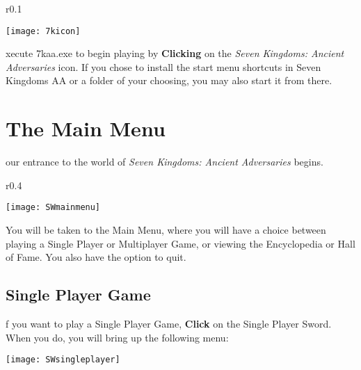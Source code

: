 \begin{wrapfigure}{r}{0.1\textwidth}
	\vspace{-20pt}
	\begin{center}
		\texttt{[image: 7kicon]}
	\end{center}
	\vspace{-20pt}
\end{wrapfigure}

xecute 7kaa.exe to begin playing by \textbf{Clicking} on the \textit{Seven Kingdoms: Ancient Adversaries} icon. If you chose to install the start menu shortcuts in Seven Kingdoms AA or a folder of your choosing, you may also start it from there.

\section{The Main Menu}


our entrance to the world of \textit{Seven Kingdoms: Ancient Adversaries} begins.

\begin{wrapfigure}{r}{0.4\textwidth}
	\begin{center}
		\vspace{-20pt}
		\texttt{[image: SWmainmenu]}
	\end{center}
	\vspace{-20pt}
\end{wrapfigure}


You will be taken to the Main Menu, where you will have a choice between playing a Single Player or Multiplayer Game, or viewing the Encyclopedia or Hall of Fame. You also have the option to quit.

\clearpage

\subsection{Single Player Game}


f you want to play a Single Player Game, \textbf{Click} on the Single Player Sword. When you do, you will bring up the following menu: 

\begin{center}
	\texttt{[image: SWsingleplayer]}
\end{center}


